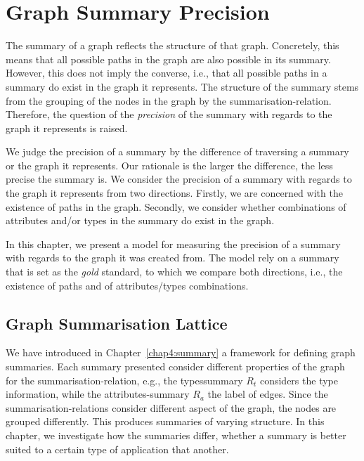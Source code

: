 \chapter{Graph Summary Precision}
\label{chap5:precision}

The summary of a graph reflects the structure of that graph. Concretely, this means that all possible paths in the graph are also possible in its summary. However, this does not imply the converse, i.e., that all possible paths in a summary do exist in the graph it represents. The structure of the summary stems from the grouping of the nodes in the graph by the \gls{summarisation-relation}. Therefore, the question of the \emph{precision} of the summary with regards to the graph it represents is raised.

We judge the precision of a summary by the difference of traversing a summary or the graph it represents. Our rationale is the larger the difference, the less precise the summary is. We consider the precision of a summary with regards to the graph it represents from two directions. Firstly, we are concerned with the existence of paths in the graph. Secondly, we consider whether combinations of \gls{attributes} and/or \gls{types} in the summary do exist in the graph.

In this chapter, we present a model for measuring the precision of a summary with regards to the graph it was created from. The model rely on a summary that is set as the \emph{gold} standard, to which we compare both directions, i.e., the existence of paths and of \gls{attributes}/\gls{types} combinations.

\section{Graph Summarisation Lattice}

We have introduced in Chapter~\ref{chap4:summary} a framework for defining graph summaries. Each summary presented consider different properties of the graph for the \gls{summarisation-relation}, e.g., the \gls{typessummary} $R_t$ considers the type information, while the \gls{attributes-summary} $R_a$ the label of edges. Since the \glspl{summarisation-relation} consider different aspect of the graph, the nodes are grouped differently. This produces summaries of varying structure. In this chapter, we investigate how the summaries differ, whether a summary is better suited to a certain type of application that another.

